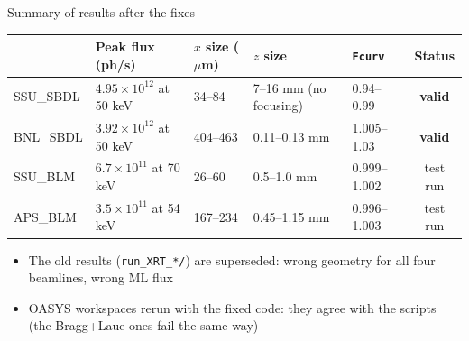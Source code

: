 \documentclass[aspectratio=169,10pt]{beamer}
\newcommand{\ok}{\textcolor{good}{\textbf{valid}}}
\begin{document}
\begin{frame}{Summary of results after the fixes}
  \small
  \centering
  \footnotesize
  \begin{tabular}{@{}lllllc@{}}
    \toprule
    & Peak flux (ph/s) & $x$ size ($\mu$m) & $z$ size & \texttt{Fcurv} & Status \\
    \midrule
    SSU\_SBDL & $4.95\times10^{12}$ at 50 keV & 34--84   & 7--16 mm (no focusing) & 0.94--0.99  & \ok \\
    BNL\_SBDL & $3.92\times10^{12}$ at 50 keV & 404--463 & 0.11--0.13 mm          & 1.005--1.03 & \ok \\
    SSU\_BLM  & $6.7\times10^{11}$ at 70 keV  & 26--60   & 0.5--1.0 mm            & 0.999--1.002 & test run \\
    APS\_BLM  & $3.5\times10^{11}$ at 54 keV  & 167--234 & 0.45--1.15 mm          & 0.996--1.003 & test run \\
    \bottomrule
  \end{tabular}

  \vspace{1em}
  \small\raggedright
  \begin{itemize}
    \item The old results (\texttt{run\_XRT\_*/}) are superseded: wrong geometry for all four
      beamlines, wrong ML flux
    \item OASYS workspaces rerun with the fixed code: they agree with the scripts (the
      Bragg+Laue ones fail the same way)
  \end{itemize}
\end{frame}
\end{document}
